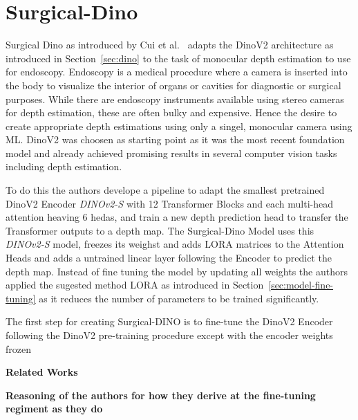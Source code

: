 \section{Surgical-Dino}
Surgical Dino as introduced by Cui et al.~\cite{Cui2024} adapts the DinoV2 architecture as introduced in Section~\ref{sec:dino} to the task of monocular depth estimation to use for endoscopy.
Endoscopy is a medical procedure where a camera is inserted into the body to visualize the interior of organs or cavities for diagnostic or surgical purposes.
While there are endoscopy instruments available using stereo cameras for depth estimation, these are often bulky and expensive. 
Hence the desire to create appropriate depth estimations using only a singel, monocular camera using ML.
DinoV2 was choosen as starting point as it was the most recent foundation model and already achieved promising results in several computer vision tasks including depth estimation.

To do this the authors develope a pipeline to adapt the smallest pretrained DinoV2 Encoder \emph{DINOv2-S} with 12 Transformer Blocks and each multi-head attention heaving 6 hedas,  and train a new depth prediction head to transfer the Transformer outputs to a depth map.
The Surgical-Dino Model uses this \emph{DINOv2-S} model, freezes its weighst and adds LORA matrices to the Attention Heads and adds a untrained linear layer following the Encoder to predict the depth map.
Instead of fine tuning the model by updating all weights the authors applied the sugested method LORA as introduced in Section~\ref{sec:model-fine-tuning} as it reduces the number of parameters to be trained significantly.


The first step for creating Surgical-DINO is to fine-tune the DinoV2 Encoder following the DinoV2 pre-training procedure except with the encoder weights frozen

\textbf{Related Works}

\textbf{Reasoning of the authors for how they derive at the fine-tuning regiment as they do}

